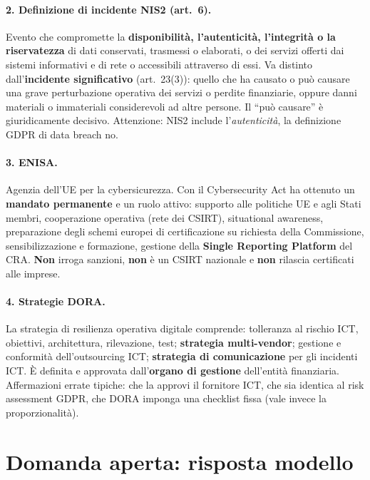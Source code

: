 \paragraph{2. Definizione di incidente NIS2 (art.~6).} Evento che compromette la
\textbf{disponibilità, l'autenticità, l'integrità o la riservatezza} di dati conservati, trasmessi o
elaborati, o dei servizi offerti dai sistemi informativi e di rete o accessibili attraverso di essi.
Va distinto dall'\textbf{incidente significativo} (art.~23(3)): quello che ha causato o può causare
una grave perturbazione operativa dei servizi o perdite finanziarie, oppure danni materiali o
immateriali considerevoli ad altre persone. Il ``può causare'' è giuridicamente decisivo.
Attenzione: NIS2 include l'\emph{autenticità}, la definizione GDPR di data breach no.

\paragraph{3. ENISA.} Agenzia dell'UE per la cybersicurezza. Con il Cybersecurity Act ha ottenuto un
\textbf{mandato permanente} e un ruolo attivo: supporto alle politiche UE e agli Stati membri,
cooperazione operativa (rete dei CSIRT), situational awareness, preparazione degli schemi europei di
certificazione su richiesta della Commissione, sensibilizzazione e formazione, gestione della
\textbf{Single Reporting Platform} del CRA. \textbf{Non} irroga sanzioni, \textbf{non} è un CSIRT
nazionale e \textbf{non} rilascia certificati alle imprese.

\paragraph{4. Strategie DORA.} La strategia di resilienza operativa digitale comprende: tolleranza al
rischio ICT, obiettivi, architettura, rilevazione, test; \textbf{strategia multi-vendor}; gestione e
conformità dell'outsourcing ICT; \textbf{strategia di comunicazione} per gli incidenti ICT. È definita
e approvata dall'\textbf{organo di gestione} dell'entità finanziaria. Affermazioni errate tipiche: che
la approvi il fornitore ICT, che sia identica al risk assessment GDPR, che DORA imponga una checklist
fissa (vale invece la proporzionalità).

\section{Domanda aperta: risposta modello}

